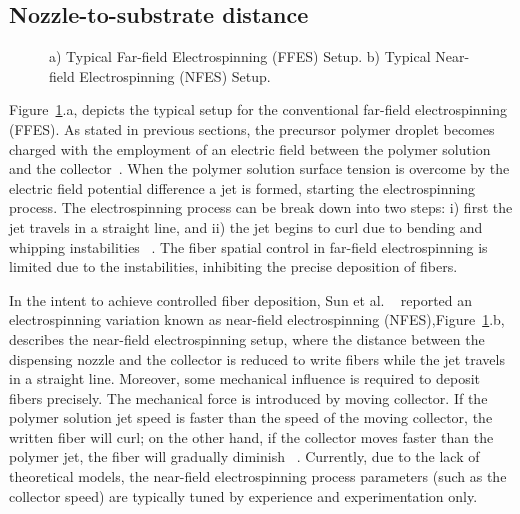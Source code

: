 \subsection{Nozzle-to-substrate distance}
\bgroup
\begin{figure}[!htbp]
\centering \makeatletter{}
\makeatother 
\caption{{a) Typical Far-field Electrospinning (FFES) Setup. b) Typical Near-field Electrospinning (NFES) Setup.}}
\label{f-c34559531e3e}
\end{figure}
\egroup
Figure~\ref{f-c34559531e3e}.a, depicts the typical setup for the conventional far-field electrospinning (FFES). As stated in previous sections, the precursor polymer droplet becomes charged with the employment of an electric field between the polymer solution and the collector\unskip~\cite{527120:14135125}. When the polymer solution surface tension is overcome by the electric field potential difference a jet is formed, starting the electrospinning process. The electrospinning process can be break down into two steps: i) first the jet travels in a straight line, and ii) the jet begins to curl due to bending and whipping instabilities \unskip~\cite{527120:13444381,527120:14135543}. The fiber spatial control in far-field electrospinning is limited due to the instabilities, inhibiting the precise deposition of fibers.

In the intent to achieve controlled fiber deposition, Sun et al. \unskip~\cite{527120:11974321} reported an electrospinning variation known as near-field electrospinning (NFES),Figure~\ref{f-c34559531e3e}.b, describes the near-field electrospinning setup, where the distance between the dispensing nozzle and the collector is reduced to write fibers while the jet travels in a straight line. Moreover, some mechanical influence is required to deposit fibers precisely. The mechanical force is introduced by moving collector. If the polymer solution jet speed is faster than the speed of the moving collector, the written fiber will curl; on the other hand, if the collector moves faster than the polymer jet, the fiber will gradually diminish \unskip~\cite{527120:11974327,527120:11974326}. Currently, due to the lack of theoretical models, the near-field electrospinning process parameters (such as the collector speed) are typically tuned by experience and experimentation only.

